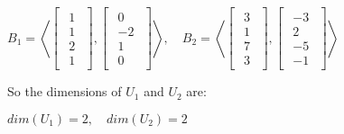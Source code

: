 \begin{math}
    B_1 = \left<\begin{bmatrix}
        \begin{array}{c}
            1 \\
            1 \\
            2 \\
            1
        \end{array}
    \end{bmatrix},
    \begin{bmatrix}
        \begin{array}{c}
            0  \\
            -2 \\
            1  \\
            0
        \end{array}
    \end{bmatrix}\right>,
    \quad
    B_2 = \left<\begin{bmatrix}
        \begin{array}{c}
            3 \\
            1 \\
            7 \\
            3
        \end{array}
    \end{bmatrix},
    \begin{bmatrix}
        \begin{array}{c}
            -3 \\
            2  \\
            -5 \\
            -1
        \end{array}
    \end{bmatrix}\right>
\end{math}

\singlespacing
\singlespacing

So the dimensions of $U_1$ and $U_2$ are:

\singlespacing

\begin{math}
    dim(U_1) = 2,\quad dim(U_2) = 2
\end{math}

\singlespacing
